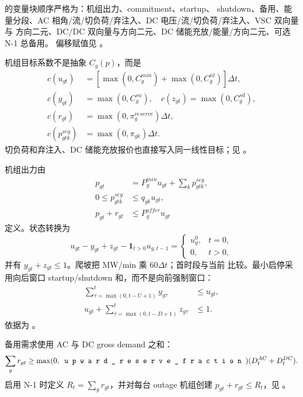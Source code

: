  的变量块顺序严格为：机组出力、commitment、startup、
shutdown、备用、能量分段、AC 相角/流/切负荷/弃注入、DC 电压/流/切负荷/弃注入、VSC 双向量与
方向二元、DC/DC 双向量与方向二元、DC 储能充放/能量/方向二元、可选 N-1 总备用。
偏移赋值见 。

机组目标系数不是抽象 $C_g(p)$，而是
\begin{align}
 c(u_{gt})&=[\max(0,C_g^{min})+\max(0,C_g^{nl})]\Delta t,\\
 c(y_{gt})&=\max(0,C_g^{su}),\quad
 c(z_{gt})=\max(0,C_g^{sd}),\\
 c(r_{gt})&=\max(0,\pi_g^{reserve})\Delta t,\\
 c(p_{gtk}^{seg})&=\max(0,\pi_{gk})\Delta t.
\end{align}
切负荷和弃注入、DC 储能充放报价也直接写入同一线性目标；见
。

机组出力由
\begin{align}
 p_{gt}&=P_g^{min}u_{gt}+\sum_kp_{gtk}^{seg},\\
 0\le p_{gtk}^{seg}&\le q_{gk}u_{gt},\\
 p_{gt}+r_{gt}&\le P_g^{offer}u_{gt}
\end{align}
定义。状态转换为
\begin{equation}
 u_{gt}-y_{gt}+z_{gt}-\mathbf 1_{t>0}u_{g,t-1}
 =\begin{cases}u_g^0,&t=0,\\0,&t>0,
 \end{cases}
\end{equation}
并有 $y_{gt}+z_{gt}\le1$。爬坡把 MW/min 乘 $60\Delta t$；首时段与当前
 比较。最小启停采用向后窗口 startup/shutdown 和，而不是向前强制窗口：
\begin{align}
 \sum_{\tau=\max(0,t-U+1)}^t y_{g\tau}&\le u_{gt},\\
 u_{gt}+\sum_{\tau=\max(0,t-D+1)}^t z_{g\tau}&\le1.
\end{align}
依据为 。

备用需求使用 AC 与 DC gross demand 之和：
\begin{equation}
 \sum_gr_{gt}\ge\max(0,\fld{upward\_reserve\_fraction})
 (D_t^{AC}+D_t^{DC}).
\end{equation}
启用 N-1 时定义 $R_t=\sum_gr_{gt}$，并对每台 outage 机组创建
$p_{gt}+r_{gt}\le R_t$，见 。

